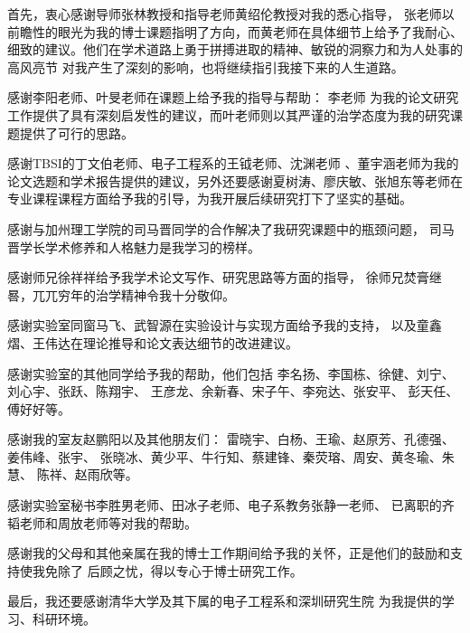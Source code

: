 
\begin{acknowledgements}
  首先，衷心感谢导师张林教授和指导老师黄绍伦教授对我的悉心指导，
  张老师以前瞻性的眼光为我的博士课题指明了方向，而黄老师在具体细节上给予了我耐心、
  细致的建议。他们在学术道路上勇于拼搏进取的精神、敏锐的洞察力和为人处事的高风亮节
  对我产生了深刻的影响，也将继续指引我接下来的人生道路。

  感谢李阳老师、叶旻老师在课题上给予我的指导与帮助：
  李老师 为我的论文研究工作提供了具有深刻启发性的建议，而叶老师则以其严谨的治学态度为我的研究课题提供了可行的思路。

 感谢TBSI的丁文伯老师、电子工程系的王钺老师、沈渊老师 、董宇涵老师为我的论文选题和学术报告提供的建议，另外还要感谢夏树涛、廖庆敏、张旭东等老师在专业课程课程方面给予我的引导，为我开展后续研究打下了坚实的基础。
 
 感谢与加州理工学院的司马晋同学的合作解决了我研究课题中的瓶颈问题，
 司马晋学长学术修养和人格魅力是我学习的榜样。
 
 感谢师兄徐祥祥给予我学术论文写作、研究思路等方面的指导，
 徐师兄焚膏继晷，兀兀穷年的治学精神令我十分敬仰。
 
感谢实验室同窗马飞、武智源在实验设计与实现方面给予我的支持，
以及童鑫熠、王伟达在理论推导和论文表达细节的改进建议。

感谢实验室的其他同学给予我的帮助，他们包括
李名扬、李国栋、徐健、刘宁、刘心宇、张跃、陈翔宇、
王彦龙、余新春、宋子午、李宛达、张安平、
彭天任、傅好好等。

感谢我的室友赵鹏阳以及其他朋友们：
雷晓宇、白杨、王瑜、赵原芳、孔德强、姜伟峰、张宇、
张晓冰、黄少平、牛行知、蔡建锋、秦荧瑢、周安、黄冬瑜、朱慧、
陈祥、赵雨欣等。

感谢实验室秘书李胜男老师、田冰子老师、电子系教务张静一老师、
已离职的齐韬老师和周放老师等对我的帮助。

感谢我的父母和其他亲属在我的博士工作期间给予我的关怀，正是他们的鼓励和支持使我免除了
后顾之忧，得以专心于博士研究工作。

最后，我还要感谢清华大学及其下属的电子工程系和深圳研究生院
为我提供的学习、科研环境。
\end{acknowledgements}
